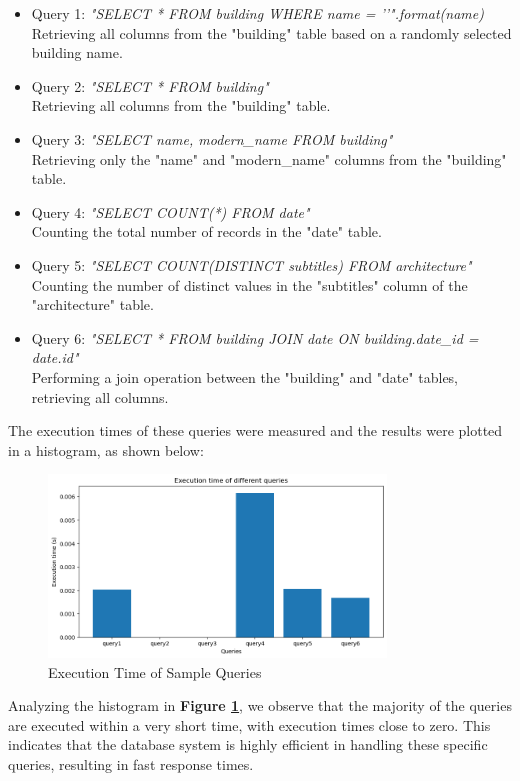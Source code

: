 \begin{itemize}
    \item Query 1:  \textit{"SELECT * FROM building WHERE name = '{}'".format(name)}\\
    Retrieving all columns from the "building" table based on a randomly selected building name.
    \item Query 2: \textit{"SELECT * FROM building"}\\
    Retrieving all columns from the "building" table.
    \item Query 3: \textit{"SELECT name, modern\_name FROM building"}\\
    Retrieving only the "name" and "modern\_name" columns from the "building" table.
    \item Query 4: \textit{"SELECT COUNT(*) FROM date"}\\
    Counting the total number of records in the "date" table.
    \item Query 5: \textit{"SELECT COUNT(DISTINCT subtitles) FROM architecture"}\\
    Counting the number of distinct values in the "subtitles" column of the "architecture" table.
    \item Query 6: \textit{"SELECT * FROM building JOIN date ON building.date\_id = date.id"}\\
    Performing a join operation between the "building" and "date" tables, retrieving all columns.
\end{itemize}

The execution times of these queries were measured and the results were plotted in a histogram, as shown below:

\begin{figure}[H]
\centering
\includegraphics[width=0.8\textwidth]{Images/queries.png}
\caption{Execution Time of Sample Queries}
\label{fig:queries}
\end{figure}

Analyzing the histogram in \textbf{Figure \ref{fig:queries}}, we observe that the majority of the queries are executed within a very short time, with execution times close to zero. This indicates that the database system is highly efficient in handling these specific queries, resulting in fast response times.

